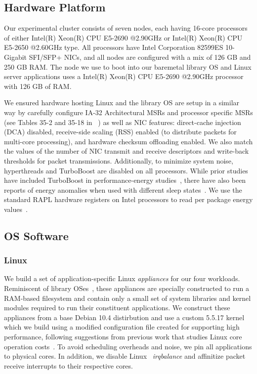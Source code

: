 \subsection{Hardware Platform}
\label{sec:exp_setup}
Our experimental cluster consists of seven nodes,
each having 16-core processors of either 
Intel(R) Xeon(R) CPU E5-2690 @2.90GHz
or Intel(R) Xeon(R) CPU E5-2650 @2.60GHz type.
All processors have Intel Corporation 82599ES 10-Gigabit SFI/SFP+ NICs,
and all nodes are configured with a mix of 126 GB and 250 GB RAM.
The node we use to boot into our baremetal library OS and Linux server applications uses a Intel(R) Xeon(R) CPU E5-2690 @2.90GHz processor with 126 GB of RAM.

We ensured hardware hosting Linux and the library OS
are setup in a similar way by carefully configure IA-32 Architectural MSRs and processor specific MSRs
(see Tables 35-2 and 35-18 in ~\cite{intel_msr})
as well as NIC features:
direct-cache injection (DCA) disabled,
receive-side scaling (RSS) enabled
(to distribute packets for multi-core processing),
and hardware checksum offloading enabled.
We also match the values of
the number of NIC transmit and receive descriptors
and write-back thresholds for packet transmissions.
Additionally, to minimize system noise, hyperthreads and TurboBoost are disabled on all processors. While prior studies have included TurboBoost in performance-energy studies~\cite{udpm, pacingtoidle, PerAppPower, ixcp}, there have also been reports of energy anomalies when used with different sleep states~\cite{slowdownorsleep}. We use the standard RAPL hardware registers on Intel processors to read per package energy values~\cite{intel_rapl, rapl}.

\subsection{OS Software}
\label{sec:OS}

\subsubsection{Linux}
\label{sec:OS_linux}
We build a set of application-specific Linux \textit{appliances} for our four workloads. Reminiscent of library OSes~\cite{unikernels}, these appliances are specially constructed to run a RAM-based filesystem and contain only a small set of system libraries and kernel modules required to run their constituent applications. We construct these appliances from a base Debian 10.4 distirbution and use a custom 5.5.17 kernel which we build using a modified configuration file created for supporting high performance, following suggestions from previous work that studies Linux core operation costs~\cite{linux-core-ops}. To avoid scheduling overheads and noise, we pin all applications to physical cores. In addition, we disable Linux ~\textit{irqbalance} and affinitize packet receive interrupts to their respective cores.

